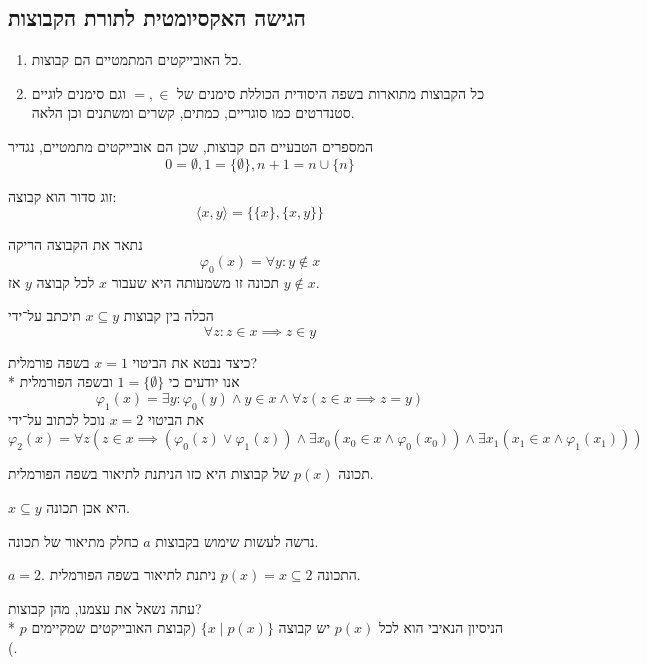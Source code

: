 \subsection{הגישה האקסיומטית לתורת הקבוצות}
\begin{definition}
	\begin{enumerate}
		\item כל האובייקטים המתמטיים הם קבוצות.
		\item כל הקבוצות מתוארות בשפה היסודית הכוללת סימנים של $=, \in$ וגם סימנים לוגיים סטנדרטים כמו סוגריים, כמתים, קשרים ומשתנים וכן הלאה.
	\end{enumerate}
\end{definition}
\begin{example}
	המספרים הטבעיים הם קבוצות, שכן הם אובייקטים מתמטיים, נגדיר
	\[
		0 = \emptyset, 1 = \{ \emptyset \}, n + 1 = n \cup \{ n \}
	\]
\end{example}
\begin{example}
	זוג סדור הוא קבוצה:
	\[
		\langle x, y \rangle = \{ \{x\}, \{x, y \}\}
	\]
\end{example}
\begin{example}
		נתאר את הקבוצה הריקה
		\[
			\varphi_0(x) = \forall y : y \notin x
		\]
		תכונה זו משמעותה היא שעבור $x$ לכל קבוצה $y$ אז $y \notin x$.
\end{example}
\begin{example}
	הכלה בין קבוצות $x \subseteq y$ תיכתב על־ידי
	\[
		\forall z : z \in x \implies z \in y
	\]
\end{example}
\begin{example}
	כיצד נבטא את הביטוי $x = 1$ בשפה פורמלית? \\*
	אנו יודעים כי $1 = \{ \emptyset \}$ ובשפה הפורמלית
	\[
		\varphi_1(x) = \exists y : \varphi_0(y) \land y \in x \land \forall z (z \in x \implies z = y)
	\]
	את הביטוי $x = 2$ נוכל לכתוב על־ידי
	\[
		\varphi_2(x) = \forall z ( z \in x \implies (\varphi_0(z) \lor \varphi_1(z)) \land \exists x_0 (x_0 \in x \land \varphi_0(x_0)) \land \exists x_1 (x_1 \in x \land \varphi_1(x_1)))
	\]
\end{example}
\begin{definition}[תכונה]
	תכונה $p(x)$ של קבוצות היא כזו הניתנת לתיאור בשפה הפורמלית.
\end{definition}
\begin{example}
	$x \subseteq y$ היא אכן תכונה.
\end{example}
\begin{remark}
	נרשה לעשות שימוש בקבוצות $a$ כחלק מתיאור של תכונה.
\end{remark}
\begin{example}
	$a = 2$. התכונה $p(x) = x \subseteq 2$ ניתנת לתיאור בשפה הפורמלית.
\end{example}
עתה נשאל את עצמנו, מהן קבוצות? \\*
הניסיון הנאיבי הוא לכל $p(x)$ יש קבוצה $\{ x \mid p(x) \}$ (קבוצת האובייקטים שמקיימים $p$).

